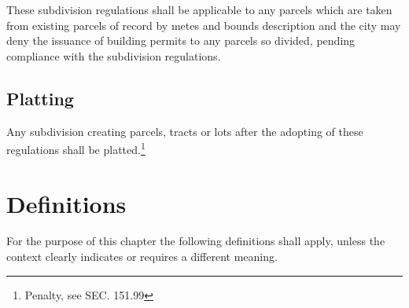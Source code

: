 \subsubsection{}
These subdivision regulations shall be applicable to any parcels which are taken from existing parcels of record by metes and bounds description and the city may deny the issuance of building permits to any parcels so divided, pending compliance with the subdivision regulations.
\subsection{Platting}
Any subdivision creating parcels, tracts or lots after the adopting of these regulations shall be platted.\footnote{Penalty, see SEC. 151.99}

\section{Definitions}
For the purpose of this chapter the following definitions shall apply, unless the context clearly indicates or requires a different meaning.
